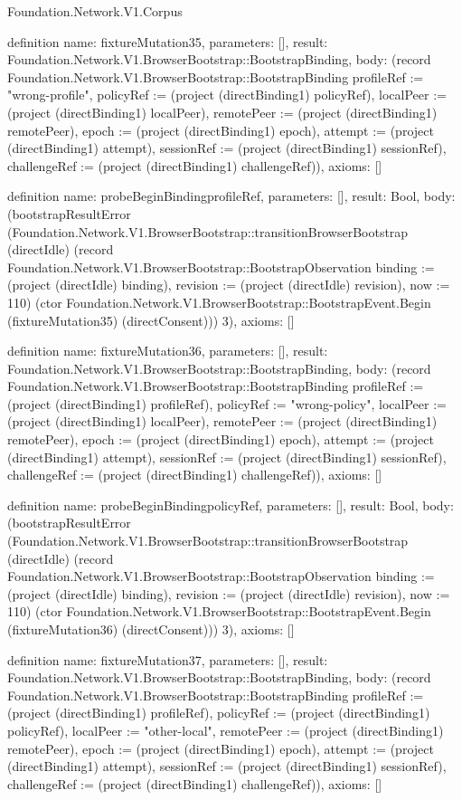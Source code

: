 \begin{lexlean}{Foundation.Network.V1.Corpus}
\begin{semanticmodule}
definition{
  name: fixtureMutation35,
  parameters: [],
  result: Foundation.Network.V1.BrowserBootstrap::BootstrapBinding,
  body: (record Foundation.Network.V1.BrowserBootstrap::BootstrapBinding {profileRef := "wrong-profile", policyRef := (project (directBinding1) policyRef), localPeer := (project (directBinding1) localPeer), remotePeer := (project (directBinding1) remotePeer), epoch := (project (directBinding1) epoch), attempt := (project (directBinding1) attempt), sessionRef := (project (directBinding1) sessionRef), challengeRef := (project (directBinding1) challengeRef)}),
  axioms: []
}

definition{
  name: probeBeginBindingprofileRef,
  parameters: [],
  result: Bool,
  body: (bootstrapResultError (Foundation.Network.V1.BrowserBootstrap::transitionBrowserBootstrap (directIdle) (record Foundation.Network.V1.BrowserBootstrap::BootstrapObservation {binding := (project (directIdle) binding), revision := (project (directIdle) revision), now := 110}) (ctor Foundation.Network.V1.BrowserBootstrap::BootstrapEvent.Begin (fixtureMutation35) (directConsent))) 3),
  axioms: []
}

definition{
  name: fixtureMutation36,
  parameters: [],
  result: Foundation.Network.V1.BrowserBootstrap::BootstrapBinding,
  body: (record Foundation.Network.V1.BrowserBootstrap::BootstrapBinding {profileRef := (project (directBinding1) profileRef), policyRef := "wrong-policy", localPeer := (project (directBinding1) localPeer), remotePeer := (project (directBinding1) remotePeer), epoch := (project (directBinding1) epoch), attempt := (project (directBinding1) attempt), sessionRef := (project (directBinding1) sessionRef), challengeRef := (project (directBinding1) challengeRef)}),
  axioms: []
}

definition{
  name: probeBeginBindingpolicyRef,
  parameters: [],
  result: Bool,
  body: (bootstrapResultError (Foundation.Network.V1.BrowserBootstrap::transitionBrowserBootstrap (directIdle) (record Foundation.Network.V1.BrowserBootstrap::BootstrapObservation {binding := (project (directIdle) binding), revision := (project (directIdle) revision), now := 110}) (ctor Foundation.Network.V1.BrowserBootstrap::BootstrapEvent.Begin (fixtureMutation36) (directConsent))) 3),
  axioms: []
}

definition{
  name: fixtureMutation37,
  parameters: [],
  result: Foundation.Network.V1.BrowserBootstrap::BootstrapBinding,
  body: (record Foundation.Network.V1.BrowserBootstrap::BootstrapBinding {profileRef := (project (directBinding1) profileRef), policyRef := (project (directBinding1) policyRef), localPeer := "other-local", remotePeer := (project (directBinding1) remotePeer), epoch := (project (directBinding1) epoch), attempt := (project (directBinding1) attempt), sessionRef := (project (directBinding1) sessionRef), challengeRef := (project (directBinding1) challengeRef)}),
  axioms: []
}


\end{semanticmodule}
\end{lexlean}

